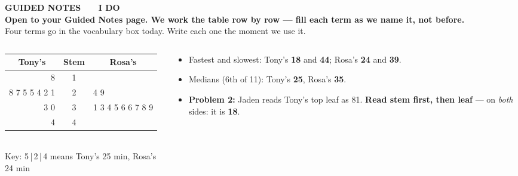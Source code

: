 \documentclass[aspectratio=169, 11pt]{beamer}
\newcommand{\redink}[1]{{\color{redacc}\bfseries #1}}
\begin{document}
{
\begin{frame}[plain]
  \vspace{1.8cm}\hspace{0.8cm}%
  \begin{minipage}{0.86\textwidth}
    {\color{goldacc}\bfseries\small GUIDED NOTES \ \textbullet\ \ I DO}\\[0.7cm]
    {\color{white}\bfseries\Large Open to your Guided Notes page. We work the table row by
    row --- fill each term as we name it, not before.}\\[0.9cm]
    {\color{frostmid}\small Four terms go in the vocabulary box today. Write each one the
    moment we use it.}
  \end{minipage}
\end{frame}
}

\begin{frame}[t, plain]
  \begin{columns}[t]
    \begin{column}{0.5\textwidth}
      \begin{center}
        {\ttfamily\renewcommand{\arraystretch}{1.3}%
        \begin{tabular}{r|c|l}
        \multicolumn{1}{c}{\rmfamily\bfseries Tony's} & \multicolumn{1}{c}{\rmfamily\bfseries Stem} & \multicolumn{1}{c}{\rmfamily\bfseries Rosa's} \\ \hline
        8 & 1 & \\
        8 7 5 5 4 2 1 & 2 & 4 9 \\
        3 0 & 3 & 1 3 4 5 6 6 7 8 9 \\
        4 & 4 & \\ \hline
        \end{tabular}}\\[6pt]
        {\small Key: 5\,|\,2\,|\,4 means Tony's 25 min, Rosa's 24 min}
      \end{center}
    \end{column}
    \begin{column}{0.46\textwidth}
      \begin{itemize}\setlength{\itemsep}{5pt}
        \item Fastest and slowest: Tony's \textbf{18} and \textbf{44}; Rosa's \textbf{24}
              and \textbf{39}.
        \item Medians (6th of 11): Tony's \textbf{25}, Rosa's \textbf{35}.
        \item \textbf{Problem 2:} Jaden reads Tony's top leaf as 81. \textbf{Read stem first,
              then leaf} --- on \emph{both} sides: it is \redink{18}.
      \end{itemize}
    \end{column}
  \end{columns}
\end{frame}
\end{document}
